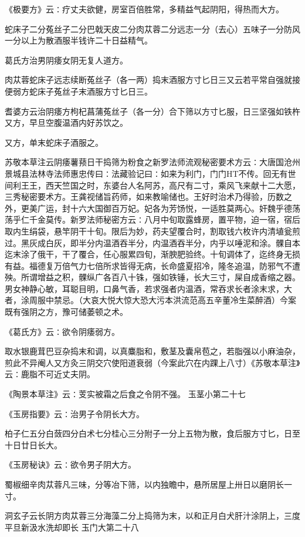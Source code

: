 \documentclass[a4paper,12pt,UTF8,twoside]{ctexbook}
\begin{document}
《极要方》云∶疗丈夫欲健，房室百倍胜常，多精益气起阴阳，得热而大方。

蛇床子二分菟丝子二分巴戟天皮二分肉苁蓉二分远志一分（去心）五味子一分防风一分以上为散酒服半钱许二十日益精气。

葛氏方治男阴痿女阴无复人道方。

肉苁蓉蛇床子远志续断菟丝子（各一两）捣末酒服方寸匕日三又云若平常自强就接便弱方蛇床子菟丝子末酒服方寸匕日三。

耆婆方云治阴痿方枸杞菖蒲菟丝子（各一分）合下筛以方寸匕服，日三坚强如铁杵又方，早旦空腹温酒内好苏饮之。

又方，单末蛇床子酒服之。

苏敬本草注云阴痿薯蓣日干捣筛为粉食之新罗法师流观秘密要术方云∶大唐国沧州景城县法林寺法师惠忠传曰∶法藏验记曰∶如来为利门，门门HT不传。回无有世间利王王，西天竺国之时，东婆台人名阿苏，高尺有二寸，乘风飞来献十二大愿，三秀秘密要术方。王龚视储旨药师，如来教喻储也。王好时治术乃得验，历数之外，更美广运，封十六大国御百万妃。妃各为芳饧悦，一适胜莫两心。奸魏乎德荡荡乎仁千金莫传。新罗法师秘密方云∶八月中旬取露蜂房，置平物，迫一宿，宿后取内生绢袋，悬竿阴干十旬。限后为妙，药夫望覆合时，割取钱六枚许内清埴瓮煎过。黑灰成白灰，即半分内温酒吞半分，内温酒吞半分，内乎以唾泥和涂。髁自本迄末涂了俄干，干了覆合，任心服累四旬，渐腴肥验终。十旬调体了，迄终身无损有益。福德复万倍气力七倍所求皆得无病，长命盛夏招冷，隆冬追温，防邪气不遭殃。所谓增益之积，髁纵广各百八十铢，强如铁锤，长大三寸，屎自成香缩之器。男女神静心敏，耳聪目明，口鼻气香，若求强者内温酒，常吞求长者涂末求，大者，涂周服中禁忌。（大哀大悦大惊大恐大污本洪流范高五辛董冷生菜醉酒）今案既有强阴之方，豫可储萎顿之术。

《葛氏方》云∶欲令阴痿弱方。

取水银鹿茸巴豆杂捣末和调，以真麋脂和，敷茎及囊帛苞之，若脂强以小麻油杂，煎此不异阉人又方灸三阴交穴使阳道衰弱（今案此穴在内踝上八寸）《苏敬本草注》云∶鹿脂不可近丈夫阴。

《陶景本草注》云∶芰实被霜之后食之令阴不强。
玉茎小第二十七

《玉房指要》云∶治男子令阴长大方。

柏子仁五分白蔹四分白术七分桂心三分附子一分上五物为散，食后服方寸匕，日至十日廿日长大。

《玉房秘诀》云∶欲令男子阴大方。

蜀椒细辛肉苁蓉凡三味，分等冶下筛，以内独瞻中，悬所居屋上卅日以磨阴长一寸。

洞玄子云长阴方肉苁蓉三分海藻二分上捣筛为末，以和正月白犬肝汁涂阴上，三度平旦新汲水洗却即长
玉门大第二十八
\end{document}
